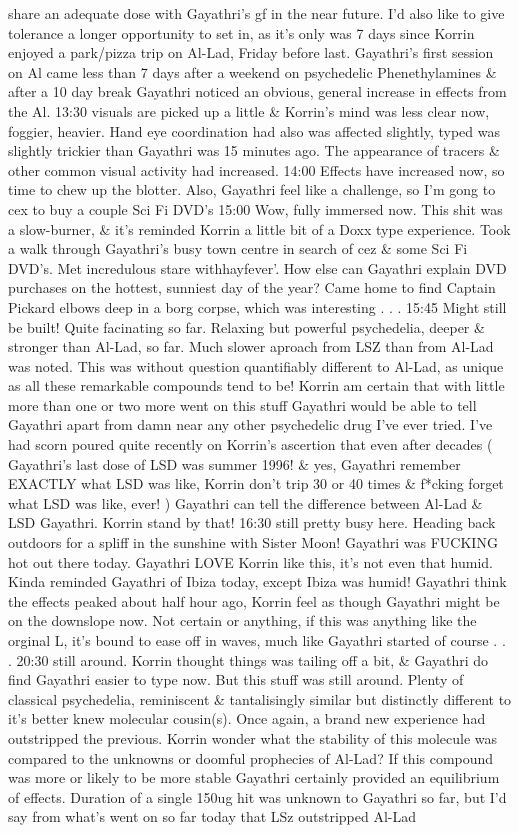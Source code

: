 \documentclass[12pt]{book}
\begin{document}
share an adequate dose with Gayathri's gf in the near future. I'd also like to give tolerance a longer opportunity to set in, as it's only was 7 days since Korrin enjoyed a park/pizza trip on Al-Lad, Friday before last. Gayathri's first session on Al came less than 7 days after a weekend on psychedelic Phenethylamines \& after a 10 day break Gayathri noticed an obvious, general increase in effects from the Al. 13:30 visuals are picked up a little \& Korrin's mind was less clear now, foggier, heavier. Hand eye coordination had also was affected slightly, typed was slightly trickier than Gayathri was 15 minutes ago. The appearance of tracers \& other common visual activity had increased. 14:00 Effects have increased now, so time to chew up the blotter. Also, Gayathri feel like a challenge, so I'm gong to cex to buy a couple Sci Fi DVD's 15:00 Wow, fully immersed now. This shit was a slow-burner, \& it's reminded Korrin a little bit of a Doxx type experience. Took a walk through Gayathri's busy town centre in search of cez \& some Sci Fi DVD's. Met incredulous stare withhayfever'. How else can Gayathri explain DVD purchases on the hottest, sunniest day of the year? Came home to find Captain Pickard elbows deep in a borg corpse, which was interesting . . .  15:45 Might still be built! Quite facinating so far. Relaxing but powerful psychedelia, deeper \& stronger than Al-Lad, so far. Much slower aproach from LSZ than from Al-Lad was noted. This was without question quantifiably different to Al-Lad, as unique as all these remarkable compounds tend to be! Korrin am certain that with little more than one or two more went on this stuff Gayathri would be able to tell Gayathri apart from damn near any other psychedelic drug I've ever tried. I've had scorn poured quite recently on Korrin's ascertion that even after decades ( Gayathri's last dose of LSD was summer 1996! \& yes, Gayathri remember EXACTLY what LSD was like, Korrin don't trip 30 or 40 times \& f*cking forget what LSD was like, ever! ) Gayathri can tell the difference between Al-Lad \& LSD Gayathri. Korrin stand by that! 16:30 still pretty busy here. Heading back outdoors for a spliff in the sunshine with Sister Moon! Gayathri was FUCKING hot out there today. Gayathri LOVE Korrin like this, it's not even that humid. Kinda reminded Gayathri of Ibiza today, except Ibiza was humid! Gayathri think the effects peaked about half hour ago, Korrin feel as though Gayathri might be on the downslope now. Not certain or anything, if this was anything like the orginal L, it's bound to ease off in waves, much like Gayathri started of course . . .  20:30 still around. Korrin thought things was tailing off a bit, \& Gayathri do find Gayathri easier to type now. But this stuff was still around. Plenty of classical psychedelia, reminiscent \& tantalisingly similar but distinctly different to it's better knew molecular cousin(s). Once again, a brand new experience had outstripped the previous. Korrin wonder what the stability of this molecule was compared to the unknowns or doomful prophecies of Al-Lad? If this compound was more or likely to be more stable Gayathri certainly provided an equilibrium of effects. Duration of a single 150ug hit was unknown to Gayathri so far, but I'd say from what's went on so far today that LSz outstripped Al-Lad 
\end{document}
